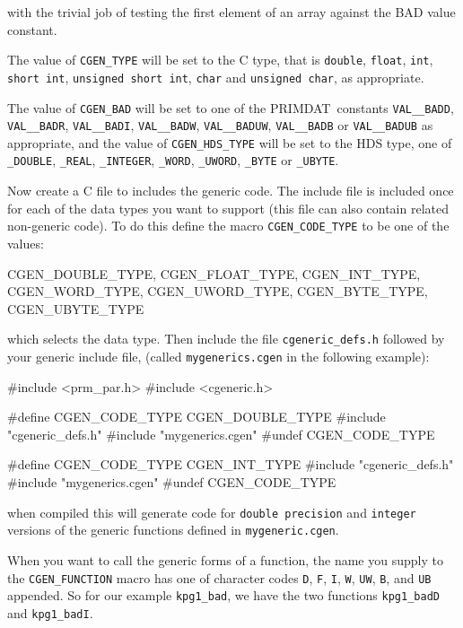 \documentclass[twoside,11pt,nolof]{starlink}
\providecommand{\PRIMDAT}{{\footnotesize PRIMDAT}\normalsize}
\begin{document}
with the trivial job of testing the first element of an array against the BAD
value constant.

The value of \texttt{CGEN\_TYPE} will be set to the C type, that is
\texttt{double}, \texttt{float}, \texttt{int}, \texttt{short int},
\texttt{unsigned short int}, \texttt{char} and \texttt{unsigned char}, as
appropriate.

The value of \texttt{CGEN\_BAD} will be set to one of the \PRIMDAT\ constants
\texttt{VAL\_\_BADD},
\texttt{VAL\_\_BADR},
\texttt{VAL\_\_BADI},
\texttt{VAL\_\_BADW},
\texttt{VAL\_\_BADUW},
\texttt{VAL\_\_BADB} or
\texttt{VAL\_\_BADUB}
as appropriate, and the value of \texttt{CGEN\_HDS\_TYPE} will be set to the HDS
type, one of
\texttt{\_DOUBLE},
\texttt{\_REAL},
\texttt{\_INTEGER},
\texttt{\_WORD},
\texttt{\_UWORD},
\texttt{\_BYTE} or
\texttt{\_UBYTE}.

Now create a C file to includes the generic code. The include file is included
once for each of the data types you want to support (this file can also
contain related non-generic code).  To do this define the macro
\texttt{CGEN\_CODE\_TYPE} to be one of the values:

\begin{terminalv}
    CGEN_DOUBLE_TYPE, CGEN_FLOAT_TYPE, CGEN_INT_TYPE, CGEN_WORD_TYPE,
    CGEN_UWORD_TYPE, CGEN_BYTE_TYPE, CGEN_UBYTE_TYPE
\end{terminalv}

which selects the data type. Then include the file \texttt{cgeneric\_defs.h}
followed by your generic include file, (called \texttt{mygenerics.cgen} in the
following example):

\begin{terminalv}
#include <prm_par.h>
#include <cgeneric.h>

#define CGEN_CODE_TYPE CGEN_DOUBLE_TYPE
#include "cgeneric_defs.h"
#include "mygenerics.cgen"
#undef CGEN_CODE_TYPE

#define CGEN_CODE_TYPE CGEN_INT_TYPE
#include "cgeneric_defs.h"
#include "mygenerics.cgen"
#undef CGEN_CODE_TYPE
\end{terminalv}

when compiled this will generate code for \texttt{double precision}
and \texttt{integer} versions of the generic functions defined in
\texttt{mygeneric.cgen}.

When you want to call the generic forms of a function, the name you supply to
the \texttt{CGEN\_FUNCTION} macro has one of character codes \texttt{D}, \texttt{F},
\texttt{I}, \texttt{W}, \texttt{UW},  \texttt{B}, and \texttt{UB} appended.  So for our
example \texttt{kpg1\_bad}, we have the two functions \texttt{kpg1\_badD} and
\texttt{kpg1\_badI}.
\end{document}
